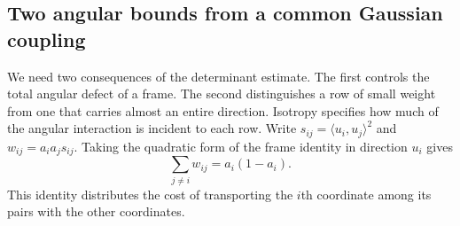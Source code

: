 \documentclass[11pt,a4paper]{article}
\theoremstyle{remark}\newtheorem{remark}[theorem]{Remark}
\numberwithin{equation}{section}
\begin{document}
\subsection{Two angular bounds from a common Gaussian coupling}
\label{sec:edge-allocation}

We need two consequences of the determinant estimate. The first controls
the total angular defect of a frame. The second distinguishes a row of
small weight from one that carries almost an entire direction. Isotropy specifies how much of
the angular interaction is incident to each row. Write
\(s_{ij}=\langle u_i,u_j\rangle^2\) and \(w_{ij}=a_i a_j s_{ij}\).
Taking the quadratic form of the frame identity in direction \(u_i\)
gives
\begin{equation}\label{eq:pair-degree}
 \sum_{j\ne i}w_{ij}=a_i(1-a_i).
\end{equation}
This identity distributes the cost of transporting the \(i\)th
coordinate among its pairs with the other coordinates.
\end{document}
